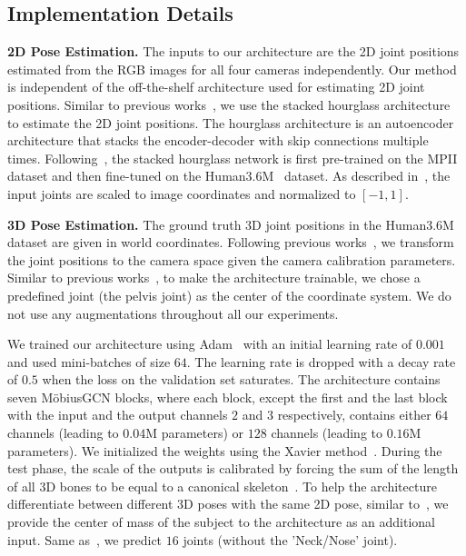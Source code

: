 \documentclass[runningheads]{llncs}
\begin{document}
\subsection{Implementation Details}
\textbf{2D Pose Estimation.} The inputs to our architecture are the 2D joint positions estimated from the RGB images for all four cameras independently. Our method is independent of the off-the-shelf architecture used for estimating 2D joint positions. Similar to previous works~\cite{martinez2017simple, zhaoCVPR19semantic}, we use the stacked hourglass architecture~\cite{newell2016stacked} to estimate the 2D joint positions. The hourglass architecture is an autoencoder architecture that stacks the encoder-decoder with skip connections multiple times. Following~\cite{zhaoCVPR19semantic}, the stacked hourglass network is first pre-trained on the MPII~\cite{andriluka14cvpr} dataset and then fine-tuned on the Human3.6M~\cite{h36m_pami} dataset. As described in~\cite{pavllo20193d}, the input joints are scaled to image coordinates and normalized to $[-1, 1]$.


\textbf{3D Pose Estimation.} The ground truth 3D joint positions in the Human3.6M dataset are given in world coordinates. Following previous works~\cite{zhaoCVPR19semantic, martinez2017simple}, we transform the joint positions to the camera space given the camera calibration parameters.
Similar to previous works~\cite{zhaoCVPR19semantic, martinez2017simple}, to make the architecture trainable, we chose a predefined joint (the pelvis joint) as the center of the coordinate system. We do not use any augmentations throughout all our experiments.

We trained our architecture using Adam~\cite{kingma2014adam} with an initial learning rate of $0.001$ and used mini-batches of size $64$. The learning rate is dropped with a decay rate of $0.5$ when the loss on the validation set saturates. The architecture contains seven M\"obiusGCN blocks, where each block, except the first and the last block with the input and the output channels $2$ and $3$ respectively, contains either $64$ channels (leading to $0.04\text{M}$ parameters) or $128$ channels (leading to $0.16\text{M}$ parameters). We initialized the weights using the Xavier method~\cite{glorot2010understanding}. 
During the test phase, the scale of the outputs is calibrated by forcing the sum of the length of all 3D bones to be equal to a canonical skeleton~\cite{pavlakos2017coarse, zhou2017towards, zhou2018monocap}. To help the architecture differentiate between different 3D poses with the same 2D pose, similar to~\citet{poier2018learning}, we provide the center of mass of the subject to the architecture as an additional input. Same as~\cite{martinez2017simple, zhaoCVPR19semantic}, we predict $16$ joints (\ie without the 'Neck/Nose' joint).
\end{document}

